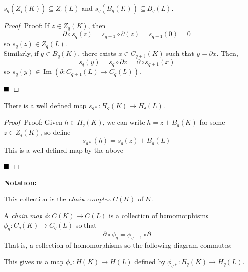 \begin{lemma}
    $s_q(Z_q(K)) \subseteq Z_q(L)$ and $s_q(B_q(K)) \subseteq B_q(L)$.
\end{lemma}
\begin{proof}{Proof:}
    If $z \in Z_q(K)$, then
    \[ \partial \circ s_q(z) = s_{q - 1} \circ \partial(z) = s_{q - 1}(0) = 0 \]
    so $s_q(z) \in Z_q(L)$.\\

    Similarly, if $y \in B_q(K)$, there exists $x \in C_{q + 1}(K)$ such that $y = \partial x$. Then,
    \[ s_q(y) = s_q \circ \partial x = \partial \circ s_{q + 1}(x) \]
    so $s_q(y) \in \operatorname{Im}(\partial : C_{q + 1}(L) \to C_q(L))$.

    $\qed$
\end{proof}

\begin{lemma}
    There is a well defined map $s_{q*} : H_q(K) \to H_q(L)$.
\end{lemma}
\begin{proof}{Proof:}
    Given $h \in H_q(K)$, we can write $h = z + B_q(K)$ for some $z \in Z_q(K)$, so define
    \[ s_{q*}(h) = s_q(z) + B_q(L) \]
    This is a well defined map by the above.

    $\qed$
\end{proof}

\textbf{Notation:}
\begin{center}
\end{center}
This collection is the \emph{chain complex} $C(K)$ of $K$.

\begin{definition}
    A \emph{chain map} $\phi : C(K) \to C(L)$ is a collection of homomorphisms $\phi_q : C_q(K) \to C_q(L)$ so that
    \[ \partial \circ \phi_q = \phi_{q - 1} \circ \partial \]
    That is, a collection of homomorphisms so the following diagram commutes:
    \begin{center}
    \end{center}
    This gives us a map $\phi_* : H(K) \to H(L)$ defined by $\phi_{q*} : H_q(K) \to H_q(L)$.
\end{definition}

